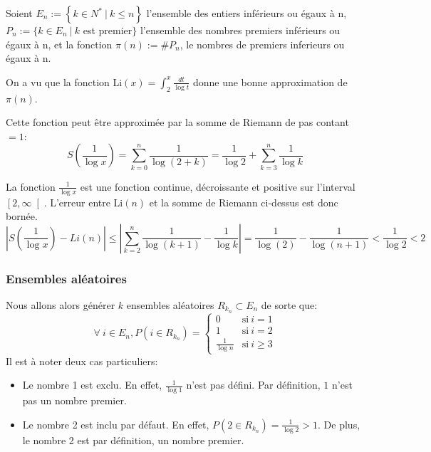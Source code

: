 \documentclass[../main.tex]{report}
\begin{document}
    \label{sec:test1}
    
Soient $E_n := \left\{ k \in N^* ~|~k \leq n \right\}$ l'ensemble des entiers inférieurs ou égaux à n, $ P_n := \{k \in E_n~|~ k$ est premier$ \}$ l'ensemble des nombres premiers inférieurs ou égaux à n, et la fonction $\pi (n) := \#P_n$, le nombres de premiers inferieurs ou égaux à n.

On a vu que la fonction Li$(x) = \int_2^x \frac{dt}{\log t}$ 
donne une bonne approximation de $\pi(n)$.

Cette fonction peut être approximée par la somme de Riemann de pas contant $=1$:
\begin{equation}
\label{eq:SommeDeRiemann}
S(\frac{1}{\log x})
= \sum_{k=0}^n \frac{1}{\log(2 + k)}
= \frac{1}{\log 2} + \sum_{k=3}^n \frac{1}{\log k}
\end{equation}


La fonction $\frac{1}{\log x}$ est une fonction continue, décroissante et positive sur l'interval $\left[2, \infty \right[$. 
L'erreur entre Li$(n)$ et la somme de Riemann ci-dessus est donc bornée. 
 \[ 
\left| S(\frac{1}{\log x}) - Li(n) \right|
\leq \left| \sum_{k=2}^n \frac{1}{\log (k+1)} - \frac{1}{\log k} \right| 
 = \frac{1}{\log (2)} - \frac{1}{\log (n+1)}
 < \frac{1}{\log 2}
 < 2
 \]


\subsubsection{Ensembles aléatoires} 

Nous allons alors générer $k$ ensembles aléatoires $R_{k_n} \subset E_n$ de sorte que:
\[
\forall~i \in E_n, P(i \in R_{k_n}) = 
\left\{ 
    \begin{array}{cl}
         0 & \mbox{si}~i = 1 \\
         1 & \mbox{si}~i = 2 \\
         \frac{1}{\log n} & \mbox{si}~i \geq 3
    \end{array}
\right.
\]
Il est à noter deux cas particuliers:
\begin{itemize} 
    \item Le nombre 1 est exclu. En effet, $\frac{1}{\log 1}$ n'est pas défini. Par définition, $1$ n'est pas un nombre premier.
    \item Le nombre 2 est inclu par défaut. En effet, $P(2 \in R_{k_n}) = \frac{1}{\log 2} > 1$. De plus, le nombre 2 est par définition, un nombre premier.
\end{itemize}
\end{document}

